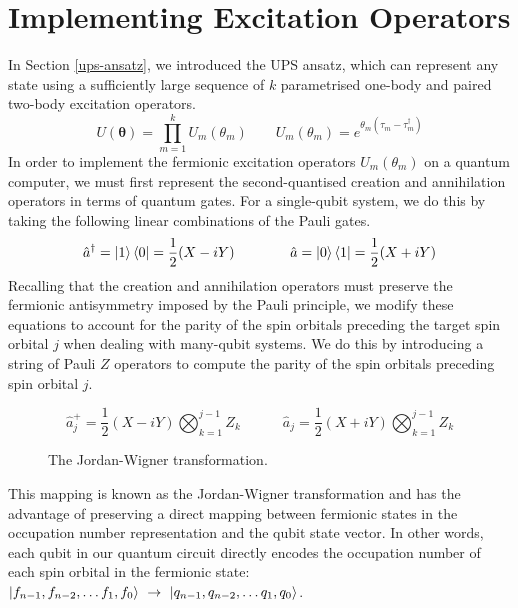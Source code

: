 \section{Implementing Excitation Operators}%
\label{implementing-excitation-operators}

In Section \ref{ups-ansatz}, we introduced the UPS ansatz, which can represent any state using a sufficiently large sequence of $k$ parametrised one-body and paired two-body excitation operators.
\begin{equation*}
    U(\bm\theta) = \prod_{m=1}^k U_m(\theta_m) \qquad
    U_m(\theta_m) = e^{\theta_m (\tau_m - \tau_m^\dagger)}
\end{equation*}
In order to implement the fermionic excitation operators $U_m(\theta_m)$ on a quantum computer, we must first represent the second-quantised creation and annihilation operators in terms of quantum gates. For a single-qubit system, we do this by taking the following linear combinations of the Pauli gates.
\begin{equation*}
    \hat a^\dagger = \ket 1 \bra 0 = \frac{1}{2} (X - iY) \qquad\qquad
    \hat a = \ket 0 \bra 1 = \frac{1}{2} (X + iY) 
\end{equation*}
Recalling that the creation and annihilation operators must preserve the fermionic antisymmetry imposed by the Pauli principle, we modify these equations to account for the parity of the spin orbitals preceding the target spin orbital $j$ when dealing with many-qubit systems. We do this by introducing a string of Pauli $Z$ operators to compute the parity of the spin orbitals preceding spin orbital $j$.

\begin{figure}[H]
    \centering
    \begin{equation*}
        \hat a_j^+ = \frac{1}{2} (X - iY) \bigotimes_{k=1}^{j-1} Z_k \qquad\quad
        \hat a_j = \frac{1}{2} (X + iY) \bigotimes_{k=1}^{j-1} Z_k
    \end{equation*}
    \caption{The Jordan-Wigner transformation.}
    \label{jordan-wigner}
\end{figure}

This mapping is known as the Jordan-Wigner transformation \cite{Seeley2020} and has the advantage of preserving a direct mapping between fermionic states in the occupation number representation and the qubit state vector. In other words, each qubit in our quantum circuit directly encodes the occupation number of each spin orbital in the fermionic state: $\ket{f_{n-1}, f_{n-2}, \dots f_1, f_0} \,\,\rightarrow\,\, \ket{q_{n-1}, q_{n-2}, \dots q_1, q_0}$.

